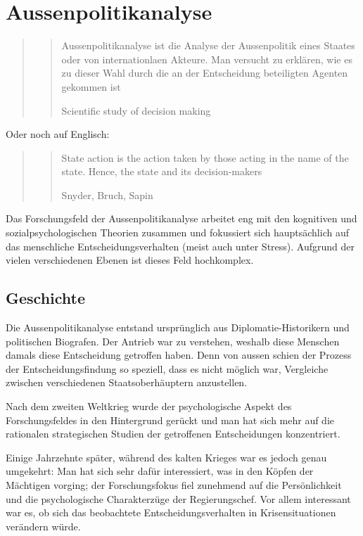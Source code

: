 \documentclass[a4paper, 11pt]{article}
\begin{document}
\section{Aussenpolitikanalyse}

\begin{quote}
	\centering
	\blockquote[Scientific study of decision making]{Aussenpolitikanalyse ist die Analyse der Aussenpolitik eines Staates oder von internationlaen Akteure. Man versucht zu erklären, wie es zu dieser Wahl durch die an der Entscheidung beteiligten Agenten gekommen ist}
\end{quote}

\noindent Oder noch auf Englisch:

\begin{quote}
	\centering
	\blockquote[Snyder, Bruch, Sapin]{State action is the action taken by those acting in the name of the state. Hence, the state and its decision-makers}
\end{quote}

Das Forschungsfeld der Aussenpolitikanalyse arbeitet eng mit den kognitiven und sozialpsychologischen Theorien zusammen und fokussiert sich hauptsächlich auf das menschliche Entscheidungsverhalten (meist auch unter Stress). Aufgrund der vielen verschiedenen Ebenen ist dieses Feld hochkomplex.

\vspace{10px}

\subsection{Geschichte}

Die Aussenpolitikanalyse entstand ursprünglich aus Diplomatie-Historikern und politischen Biografen. Der Antrieb war zu verstehen, weshalb diese Menschen damals diese Entscheidung getroffen haben. Denn von aussen schien der Prozess der Entscheidungsfindung so speziell, dass es nicht möglich war, Vergleiche zwischen verschiedenen Staatsoberhäuptern anzustellen.

Nach dem zweiten Weltkrieg wurde der psychologische Aspekt des Forschungsfeldes in den Hintergrund gerückt und man hat sich mehr auf die rationalen strategischen Studien der getroffenen Entscheidungen konzentriert.

Einige Jahrzehnte später, während des kalten Krieges war es jedoch genau umgekehrt: Man hat sich sehr dafür interessiert, was in den Köpfen der Mächtigen vorging; der Forschungsfokus fiel zunehmend auf die Persönlichkeit und die psychologische Charakterzüge der Regierungschef. Vor allem interessant war es, ob sich das beobachtete Entscheidungsverhalten in Krisensituationen verändern würde.
\end{document}
